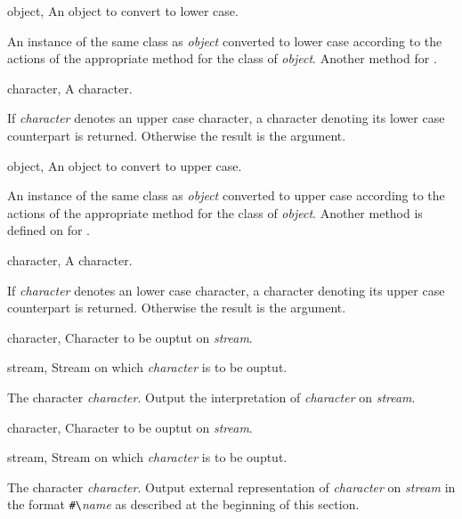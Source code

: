 \begin{optDefinition}
%
\begin{genericargs}
    \item[object, \classref{object}] An object to convert to lower case.
\end{genericargs}
%
\result%
An instance of the same class as {\em object\/} converted to lower case
according to the actions of the appropriate method for the class of {\em
    object}.
%
\seealso%
Another method  for .

%
\begin{specargs}
    \item[character, \classref{character}] A character.
\end{specargs}
%
\result%
If {\em character\/} denotes an upper case character, a character denoting its
lower case counterpart is returned.  Otherwise the result is the argument.

%
\begin{genericargs}
    \item[object, \classref{object}] An object to convert to upper case.
\end{genericargs}
%
\result%
An instance of the same class as {\em object\/} converted to upper case
according to the actions of the appropriate method for the class of {\em
    object}.
%
\seealso%
Another method is defined on  for
.

%
\begin{specargs}
    \item[character, \classref{character}] A character.
\end{specargs}
%
\result%
If {\em character\/} denotes an lower case character, a character denoting its
upper case counterpart is returned.  Otherwise the result is the argument.

%
\begin{specargs}
    \item[character, \classref{character}] Character to be ouptut on {\em
        stream}.
    \item[stream, \classref{stream}] Stream on which {\em character\/} is to be
    ouptut.
\end{specargs}
%
\result%
The character {\em character}.
%
\remarks%
Output the interpretation of {\em character\/} on {\em stream}.

%
\begin{specargs}
    \item[character, \classref{character}] Character to be ouptut on {\em
        stream}.
    \item[stream, \classref{stream}] Stream on which {\em character\/} is to be
    ouptut.
\end{specargs}
%
\result%
The character {\em character}.
%
\remarks%
Output external representation of {\em character\/} on {\em stream\/} in the
format \verb+#\+{\em{}name\/} as described at the beginning of this section.
%
\end{optDefinition}

